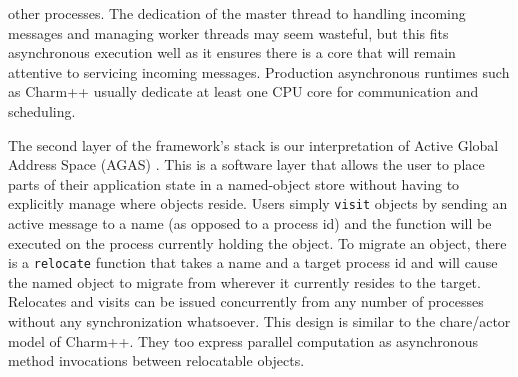 other processes.
The dedication of the master thread to handling
incoming messages and managing worker threads may seem wasteful,
but this fits asynchronous 
execution well as it ensures there is a core that will remain 
attentive to servicing incoming messages.
Production asynchronous runtimes such as Charm++
usually dedicate at least one CPU core for communication and scheduling.

The second layer of the framework's stack is our interpretation of 
Active Global Address Space (AGAS) \cite{hpx2}. This is a software layer
that allows the user to place parts of their application state in a 
named-object store without having to explicitly manage where
objects reside. Users simply {\tt visit} objects by sending an active 
message to a name (as opposed to a process id) and the function will be 
executed on the process currently holding the object.
To migrate an object, there is a {\tt relocate} function that takes a 
name and a target process id and will cause the named object to 
migrate from wherever it currently resides to the target.
Relocates and visits can be issued concurrently from any 
number of processes without any synchronization whatsoever.
This design is similar to the chare/actor model of Charm++.
They too express parallel computation as asynchronous method invocations
between relocatable objects.

